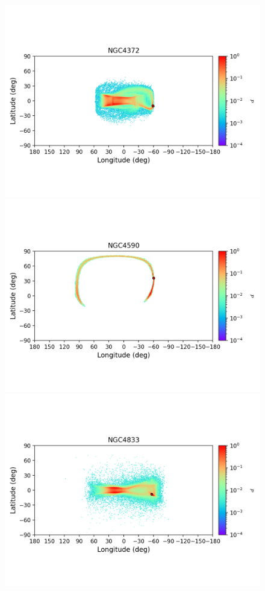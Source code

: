 \begin{figure}
        \includegraphics[clip=true, trim = 0mm 20mm 0mm 10mm, width=1\columnwidth]{images/error_plots_NGC4372.png}
        \includegraphics[clip=true, trim = 0mm 20mm 0mm 10mm, width=1\columnwidth]{images/error_plots_NGC4590.png}
        \includegraphics[clip=true, trim = 0mm 20mm 0mm 10mm, width=1\columnwidth]{images/error_plots_NGC4833.png}

\end{figure}
